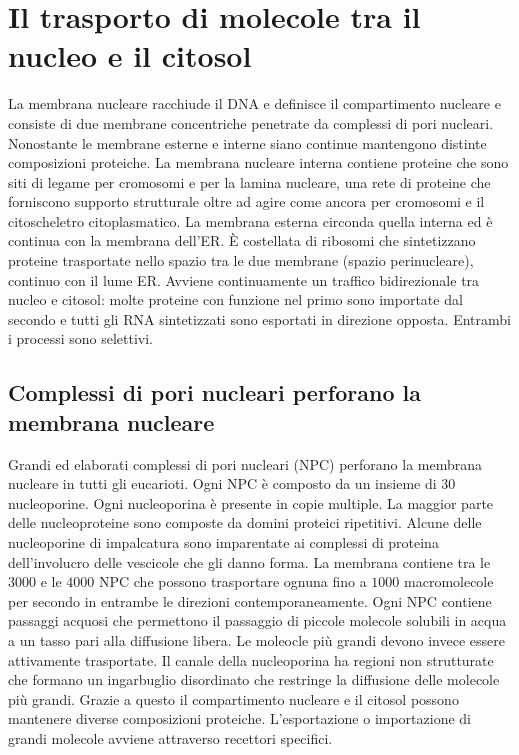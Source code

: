 \section{Il trasporto di molecole tra il nucleo e il citosol}
La membrana nucleare racchiude il DNA e definisce il compartimento nucleare e consiste di due membrane concentriche penetrate da complessi di pori nucleari. Nonostante le membrane
esterne e interne siano continue mantengono distinte composizioni proteiche. La membrana nucleare interna contiene proteine che sono siti di legame per cromosomi e per la lamina
nucleare, una rete di proteine che forniscono supporto strutturale oltre ad agire come ancora per cromosomi e il citoscheletro citoplasmatico. La membrana esterna circonda quella interna
ed \`e continua con la membrana dell'ER. \`E costellata di ribosomi che sintetizzano proteine trasportate nello spazio tra le due membrane (spazio perinucleare), continuo con il lume ER.
Avviene continuamente un traffico bidirezionale tra nucleo e citosol: molte proteine con funzione nel primo sono importate dal secondo e tutti gli RNA sintetizzati sono esportati in
direzione opposta. Entrambi i processi sono selettivi. 
\subsection{Complessi di pori nucleari perforano la membrana nucleare}
Grandi ed elaborati complessi di pori nucleari (NPC) perforano la membrana nucleare in tutti gli eucarioti. Ogni NPC \`e composto da un insieme di $30$ nucleoporine. Ogni nucleoporina
\`e presente in copie multiple. La maggior parte delle nucleoproteine sono composte da domini proteici ripetitivi. Alcune delle nucleoporine di impalcatura sono imparentate ai complessi
di proteina dell'involucro delle vescicole che gli danno forma. La membrana contiene tra le $3000$ e le $4000$ NPC che possono trasportare ognuna fino a $1000$ macromolecole per secondo
in entrambe le direzioni contemporaneamente. Ogni NPC contiene passaggi acquosi che permettono il passaggio di piccole molecole solubili in acqua a un tasso pari alla diffusione libera.
Le moleocle pi\`u grandi devono invece essere attivamente trasportate. Il canale della nucleoporina ha regioni non strutturate che formano un ingarbuglio disordinato che restringe la
diffusione delle molecole pi\`u grandi. Grazie a questo il compartimento nucleare e il citosol possono mantenere diverse composizioni proteiche. L'esportazione o importazione di 
grandi molecole avviene attraverso recettori specifici. 

